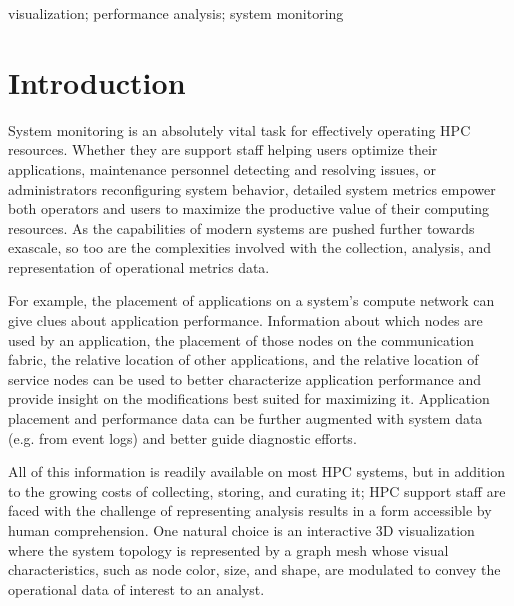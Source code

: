 \documentclass[
    10pt,
    conference,
    compsocconf
]{IEEEtran}
\begin{document}
\begin{IEEEkeywords}
    visualization; performance analysis; system monitoring
\end{IEEEkeywords}

\IEEEpeerreviewmaketitle


\section{Introduction}
    System monitoring is an absolutely vital task for effectively operating HPC
    resources.  Whether they are support staff helping users optimize their
    applications, maintenance personnel detecting and resolving issues, or
    administrators reconfiguring system behavior, detailed system metrics
    empower both operators and users to maximize the productive value of their
    computing resources.  As the capabilities of modern systems are pushed
    further towards exascale, so too are the complexities involved with the
    collection, analysis, and representation of operational metrics data.

    For example, the placement of applications on a system's compute network can
    give clues about application performance.  Information about which nodes are
    used by an application, the placement of those nodes on the communication
    fabric, the relative location of other applications, and the relative
    location of service nodes can be used to better characterize application
    performance and provide insight on the modifications best suited for
    maximizing it.  Application placement and performance data can be further
    augmented with system data (e.g. from event logs) and better guide
    diagnostic efforts.

    All of this information is readily available on most HPC systems, but
    in addition to the growing costs of collecting, storing, and curating it;
    HPC support staff are faced with the challenge of representing analysis
    results in a form accessible by human comprehension.  One natural choice is
    an interactive 3D visualization where the system topology is represented by
    a graph mesh whose visual characteristics, such as node color, size, and
    shape, are modulated to convey the operational data of interest to an
    analyst.
\end{document}
